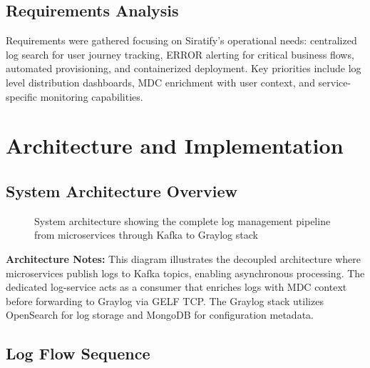 \documentclass[12pt,a4paper]{report}
\begin{document}
\section{Requirements Analysis}
Requirements were gathered focusing on Siratify's operational needs: centralized log search for user journey tracking, ERROR alerting for critical business flows, automated provisioning, and containerized deployment. Key priorities include log level distribution dashboards, MDC enrichment with user context, and service-specific monitoring capabilities.

\chapter{Architecture and Implementation}
\section{System Architecture Overview}

\begin{figure}[H]
\centering
{}
\caption{System architecture showing the complete log management pipeline from microservices through Kafka to Graylog stack}
\label{fig:system-architecture}
\end{figure}

\textbf{Architecture Notes:} This diagram illustrates the decoupled architecture where microservices publish logs to Kafka topics, enabling asynchronous processing. The dedicated log-service acts as a consumer that enriches logs with MDC context before forwarding to Graylog via GELF TCP. The Graylog stack utilizes OpenSearch for log storage and MongoDB for configuration metadata.

\section{Log Flow Sequence}
\end{document}
